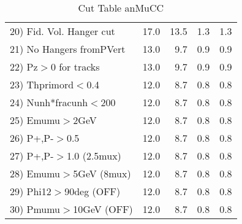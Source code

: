\begin{table}[h!]
\begin{tabular}{||l||r|r|r|r||}
 20) Fid. Vol. Hanger cut &        17.0 &        13.5 &         1.3 &         1.3 \\
 21) No Hangers fromPVert &        13.0 &         9.7 &         0.9 &         0.9 \\
 22) Pz$>$0 for tracks    &        13.0 &         9.7 &         0.9 &         0.9 \\
 23) Thprimord$<$0.4      &        12.0 &         8.7 &         0.8 &         0.8 \\
 24) Nunh*fracunh$<$200   &        12.0 &         8.7 &         0.8 &         0.8 \\
 25) Emumu$>$2GeV         &        12.0 &         8.7 &         0.8 &         0.8 \\
 26) P+,P-$>$0.5          &        12.0 &         8.7 &         0.8 &         0.8 \\
 27) P+,P-$>$1.0 (2.5mux) &        12.0 &         8.7 &         0.8 &         0.8 \\
 28) Emumu$>$5GeV  (8mux) &        12.0 &         8.7 &         0.8 &         0.8 \\
 29) Phi12$>$90deg  (OFF) &        12.0 &         8.7 &         0.8 &         0.8 \\
 30) Pmumu$>$10GeV  (OFF) &        12.0 &         8.7 &         0.8 &         0.8 \\
 \hline
 \hline
 \end{tabular}
 \caption{Cut Table  anMuCC }
 \label{tab-cut_anmcc}
 \end{table}
